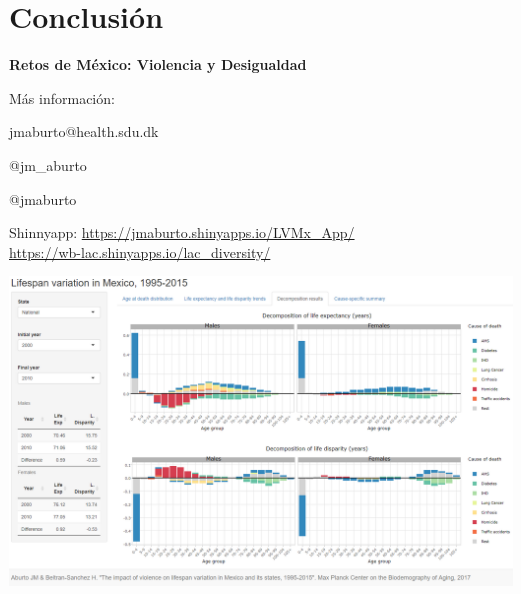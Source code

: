 \documentclass[xcolor={dvipsnames}]{beamer}
\begin{document}
\section{Conclusi\'on}
\begin{frame}
 \begin{center}
	\begin{center}
	\huge{ \textbf{Retos de M\'exico: Violencia y Desigualdad}}
	\end{center}
	
	\bigskip
	\bigskip
M\'as informaci\'on:

jmaburto@health.sdu.dk 

\faTwitter \quad  @jm\_aburto 

\faGithub \quad @jmaburto 

Shinnyapp: \url{https://jmaburto.shinyapps.io/LVMx_App/}\\
\url{https://wb-lac.shinyapps.io/lac_diversity/}


\includegraphics[scale=0.1]{Figures/Shinnyapp_fig} \\   

 

\end{center}
 
 

\end{frame}
\end{document}
